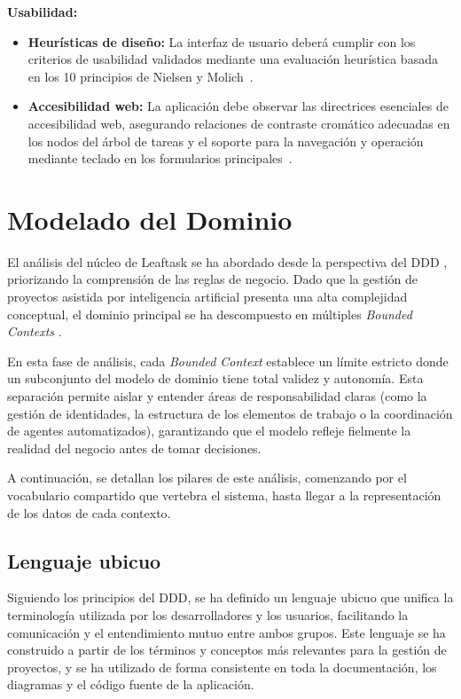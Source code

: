 \textbf{Usabilidad:}
\begin{itemize}
    \item \textbf{Heurísticas de diseño:} La interfaz de usuario deberá cumplir con los criterios de usabilidad validados mediante una evaluación heurística basada en los 10 principios de Nielsen y Molich~\cite{nielsen1990heuristic}.
    \item \textbf{Accesibilidad web:} La aplicación debe observar las directrices esenciales de accesibilidad web, asegurando relaciones de contraste cromático adecuadas en los nodos del árbol de tareas y el soporte para la navegación y operación mediante teclado en los formularios principales~\cite{w3c2018wcag21}.
\end{itemize}

\section{Modelado del Dominio}
El análisis del núcleo de Leaftask se ha abordado desde la perspectiva del \ac{DDD} \cite{evans2004ddd}, priorizando la comprensión de las reglas de negocio. Dado que la gestión de proyectos asistida por inteligencia artificial presenta una alta complejidad conceptual, el dominio principal se ha descompuesto en múltiples \emph{Bounded Contexts} \cite{fowler2014boundedcontext}.

En esta fase de análisis, cada \emph{Bounded Context} establece un límite estricto donde un subconjunto del modelo de dominio tiene total validez y autonomía. Esta separación permite aislar y entender áreas de responsabilidad claras (como la gestión de identidades, la estructura de los elementos de trabajo o la coordinación de agentes automatizados), garantizando que el modelo refleje fielmente la realidad del negocio antes de tomar decisiones.

A continuación, se detallan los pilares de este análisis, comenzando por el vocabulario compartido que vertebra el sistema, hasta llegar a la representación de los datos de cada contexto.

\subsection{Lenguaje ubicuo}

Siguiendo los principios del \ac{DDD}, se ha definido un lenguaje ubicuo que unifica la terminología utilizada por los desarrolladores y los usuarios, facilitando la comunicación y el entendimiento mutuo entre ambos grupos. Este lenguaje se ha construido a partir de los términos y conceptos más relevantes para la gestión de proyectos, y se ha utilizado de forma consistente en toda la documentación, los diagramas y el código fuente de la aplicación.

